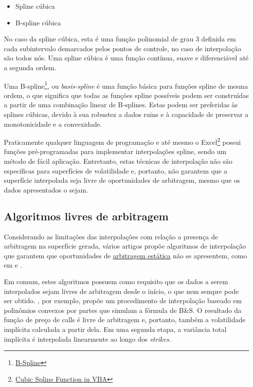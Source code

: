 \documentclass[]{book}
\providecommand{\tightlist}{%
  \setlength{\itemsep}{0pt}\setlength{\parskip}{0pt}}
\let\rmarkdownfootnote\footnote%
\def\footnote{\protect\rmarkdownfootnote}
\theoremstyle{definition}
\theoremstyle{definition}
\theoremstyle{definition}
\theoremstyle{remark}
\begin{document}
\begin{itemize}
\tightlist
\item
  Spline cúbica
\item
  B-spline cúbica
\end{itemize}

No caso da spline cúbica, esta é uma função polinomial de grau 3 definida em cada subintervalo demarcados pelos pontos de controle, no caso de interpolação são todos nós. Uma spline cúbica é uma função contínua, suave e diferenciável até a segunda ordem.

Uma B-spline\footnote{\href{https://en.wikipedia.org/wiki/B-spline}{B-Spline}}, ou \emph{basis-spline} é uma função básica para funções spline de mesma ordem, o que significa que todas as funções spline possíveis podem ser construídas a partir de uma combinação linear de B-splines. Estas podem ser preferidas às splines cúbicas, devido à sua robustez a dados ruins e à capacidade de preservar a monotonicidade e a convexidade.

Praticamente qualquer linguagem de programação e até mesmo o Excel\footnote{\href{https://www.business-spreadsheets.com/forum.asp?t=120}{Cubic Spline Function in VBA}} possui funções pré-programadas para implementar interpolações spline, sendo um método de fácil aplicação. Entretanto, estas técnicas de interpolação não são específicas para superfícies de volatilidade e, portanto, não garantem que a superfície interpolada seja livre de oportunidades de arbitragem, mesmo que os dados apresentados o sejam.

\hypertarget{algoritmos-livres-de-arbitragem}{%
\subsection{Algoritmos livres de arbitragem}\label{algoritmos-livres-de-arbitragem}}

Considerando as limitações das interpolações com relação a presença de arbitragem na superfície gerada, vários artigos propõe algoritmos de interpolação que garantem que oportunidades de \protect\hyperlink{arbestatica}{arbitragem estática} não se apresentem, como em \citet{Kahale2004} e \citet{Wang2004}.

Em comum, estes algoritmos possuem como requisito que os dados a serem interpolados sejam livres de arbitragem desde o início, o que nem sempre pode ser obtido. \citet{Kahale2004}, por exemplo, propõe um procedimento de interpolação baseado em polinômios convexos por partes que simulam a fórmula de B\&S. O resultado da função de preço de calls é livre de arbitragem e, portanto, também a volatilidade implícita calculada a partir dela. Em uma segunda etapa, a variância total implícita é interpolada linearmente ao longo dos \emph{strikes}.
\end{document}
